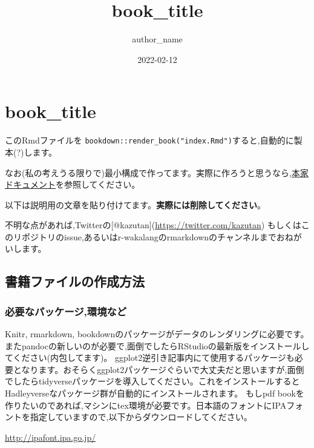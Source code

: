 \documentclass[
]{book}
\title{book\_title}
\author{author\_name}
\date{2022-02-12}
\begin{document}
\maketitle

{
\setcounter{tocdepth}{1}
\tableofcontents
}
\hypertarget{book_title}{%
\chapter{book\_title}\label{book_title}}

このRmdファイルを \texttt{bookdown::render\_book("index.Rmd")}すると,自動的に製本(?)します。

なお(私の考えうる限りで)最小構成で作ってます。実際に作ろうと思うなら,\href{https://bookdown.org/yihui/bookdown/}{本家ドキュメント}を参照してください。

以下は説明用の文章を貼り付けてます。\textbf{実際には削除してください}。

不明な点があれば,Twitterの{[}@kazutan{]}(\url{https://twitter.com/kazutan}) もしくはこのリポジトリのissue,あるいはr-wakalangのrmarkdownのチャンネルまでおねがいします。

\hypertarget{ux66f8ux7c4dux30d5ux30a1ux30a4ux30ebux306eux4f5cux6210ux65b9ux6cd5}{%
\section{書籍ファイルの作成方法}\label{ux66f8ux7c4dux30d5ux30a1ux30a4ux30ebux306eux4f5cux6210ux65b9ux6cd5}}

\hypertarget{ux5fc5ux8981ux306aux30d1ux30c3ux30b1ux30fcux30b8ux74b0ux5883ux306aux3069}{%
\subsection{必要なパッケージ,環境など}\label{ux5fc5ux8981ux306aux30d1ux30c3ux30b1ux30fcux30b8ux74b0ux5883ux306aux3069}}

Knitr, rmarkdown, bookdownのパッケージがデータのレンダリングに必要です。またpandocの新しいのが必要で,面倒でしたらRStudioの最新版をインストールしてください(内包してます)。
ggplot2逆引き記事内にて使用するパッケージも必要となります。おそらくggplot2パッケージぐらいで大丈夫だと思いますが,面倒でしたらtidyverseパッケージを導入してください。これをインストールするとHadleyverseなパッケージ群が自動的にインストールされます。
もしpdf bookを作りたいのであれば,マシンにtex環境が必要です。日本語のフォントにIPAフォントを指定していますので,以下からダウンロードしてください。

\url{http://ipafont.ipa.go.jp/}
\end{document}
